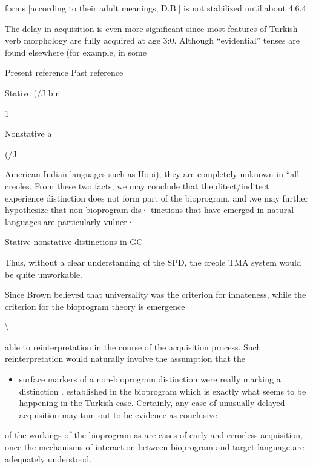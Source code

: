 forms [according to their adult meanings, D.B.] is not stabilized until.about 4:6.{\textquotedbl}4

The delay in acquisition is even more significant since most features of Turkish verb morphology are fully acquired at age 3:0. Although ``evidential'' tenses are found elsewhere (for example, in some

Present reference Past reference

Stative (/J bin

\begin{table}
\caption{1}
\label{tab:3}
\end{table}

Nonstative a

(/J

American Indian languages such as Hopi), they are completely un\-known in ``all creoles. From these two facts, we may conclude that the ditect/inditect experience distinction does not form part of the bio\-program, and .we may further hypothesize that non-bioprogram dis· tinctions that have emerged in natural languages are particularly vulner·

Stative-nonstative distinctions in GC

Thus, without a clear understanding of the SPD, the creole TMA system would be quite unworkable.

Since Brown believed that universality was the criterion for innateness, while the criterion for the bioprogram theory is emergence

{\textbackslash}

able to reinterpretation in the conrse of the acquisition process. Such reinterpretation would naturally involve the assumption that the

\begin{itemize}
\item surface markers of a non-bioprogram distinction were really marking a distinction . established in the bioprogram which is exactly what seems to be happening in the Turkish case. Certainly, any case of unusually delayed acquisition may tum out to be evidence as conclusive
\end{itemize}


of the workings of the bioprogram as are cases of early and errorless acquisition, once the mechanisms of interaction between bioprogram and target language are adequately understood.

